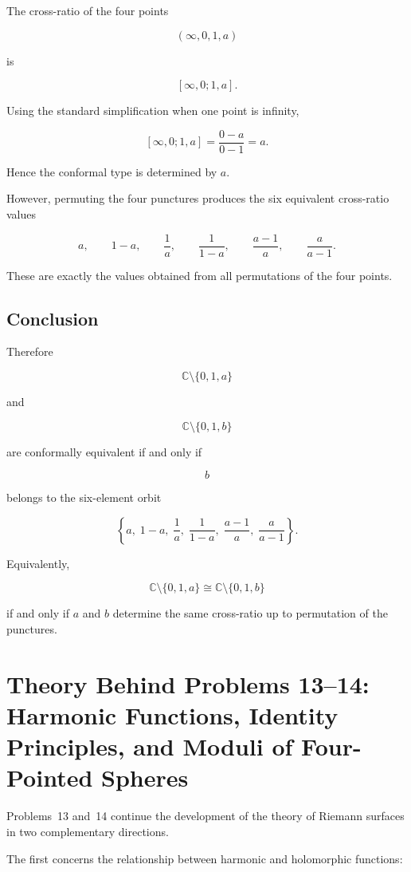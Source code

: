 \documentclass[12pt,a4paper]{article}
\theoremstyle{notespace}
\begin{document}
The cross-ratio of the four points

\[
(\infty,0,1,a)
\]

is

\[
[\infty,0;1,a].
\]

Using the standard simplification when one point is infinity,

\[
[\infty,0;1,a]
=
\frac{0-a}{0-1}
=
a.
\]

Hence the conformal type is determined by \(a\).

However, permuting the four punctures produces the six equivalent cross-ratio values

\[
a,
\qquad
1-a,
\qquad
\frac1a,
\qquad
\frac1{1-a},
\qquad
\frac{a-1}{a},
\qquad
\frac{a}{a-1}.
\]

These are exactly the values obtained from all permutations of the four points.

\subsection*{Conclusion}

Therefore

\[
\mathbb C\setminus\{0,1,a\}
\]

and

\[
\mathbb C\setminus\{0,1,b\}
\]

are conformally equivalent if and only if

\[
b
\]

belongs to the six-element orbit

\[
\boxed{
	\left\{
	a,
	\;
	1-a,
	\;
	\frac1a,
	\;
	\frac1{1-a},
	\;
	\frac{a-1}{a},
	\;
	\frac{a}{a-1}
	\right\}.
}
\]

Equivalently,

\[
\boxed{
	\mathbb C\setminus\{0,1,a\}
	\cong
	\mathbb C\setminus\{0,1,b\}
}
\]

if and only if \(a\) and \(b\) determine the same cross-ratio up to permutation of the punctures.	
	
\section{Theory Behind Problems 13--14:
	Harmonic Functions, Identity Principles, and Moduli of Four-Pointed Spheres}

Problems~13 and~14 continue the development of the theory of Riemann surfaces in two complementary directions.

The first concerns the relationship between harmonic and holomorphic functions:
\end{document}

